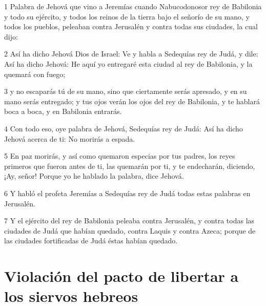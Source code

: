 \par 1 Palabra de Jehová que vino a Jeremías cuando Nabucodonosor rey de Babilonia y todo su ejército, y todos los reinos de la tierra bajo el señorío de su mano, y todos los pueblos, peleaban contra Jerusalén y contra todas sus ciudades, la cual dijo:
\par 2 Así ha dicho Jehová Dios de Israel: Ve y habla a Sedequías rey de Judá, y dile: Así ha dicho Jehová: He aquí yo entregaré esta ciudad al rey de Babilonia, y la quemará con fuego;
\par 3 y no escaparás tú de su mano, sino que ciertamente serás apresado, y en su mano serás entregado; y tus ojos verán los ojos del rey de Babilonia, y te hablará boca a boca, y en Babilonia entrarás.
\par 4 Con todo eso, oye palabra de Jehová, Sedequías rey de Judá: Así ha dicho Jehová acerca de ti: No morirás a espada.
\par 5 En paz morirás, y así como quemaron especias por tus padres, los reyes primeros que fueron antes de ti, las quemarán por ti, y te endecharán, diciendo, ¡Ay, señor! Porque yo he hablado la palabra, dice Jehová.
\par 6 Y habló el profeta Jeremías a Sedequías rey de Judá todas estas palabras en Jerusalén.
\par 7 Y el ejército del rey de Babilonia peleaba contra Jerusalén, y contra todas las ciudades de Judá que habían quedado, contra Laquis y contra Azeca; porque de las ciudades fortificadas de Judá éstas habían quedado.

\section*{Violación del pacto de libertar a los siervos hebreos}

